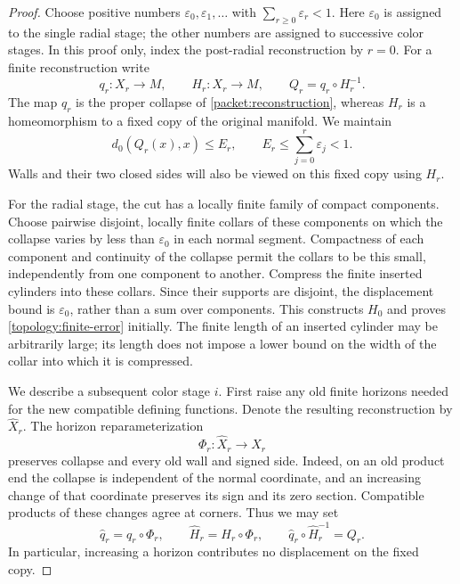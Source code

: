 \documentclass[11pt]{article}
\numberwithin{equation}{section}
\theoremstyle{definition}
\theoremstyle{remark}
\begin{document}
\begin{proof}
Choose positive numbers $\varepsilon_0,\varepsilon_1,\ldots$ with
$\sum_{r\ge0}\varepsilon_r<1$.  Here $\varepsilon_0$ is assigned to the single radial
stage; the other numbers are assigned to successive color stages.
In this proof only, index the post-radial reconstruction by $r=0$.
For a finite reconstruction write
\[
 q_r:X_r\longrightarrow M,\qquad
 H_r:X_r\longrightarrow M,\qquad
 Q_r=q_r\circ H_r^{-1}.
\]
The map $q_r$ is the proper collapse of
\cref{packet:reconstruction}, whereas $H_r$ is a homeomorphism to a
fixed copy of the original manifold.  We maintain
\begin{equation}\label{topology:finite-error}
 d_0(Q_r(x),x)\le E_r,
 \qquad E_r\le\sum_{j=0}^{r}\varepsilon_j<1.
\end{equation}
Walls and their two closed sides will also be viewed on this fixed copy
using $H_r$.

For the radial stage, the cut has a locally finite family of compact
components.  Choose pairwise disjoint, locally finite collars of these
components on which the collapse varies by less than $\varepsilon_0$ in each
normal segment.  Compactness of each component and continuity of the
collapse permit the collars to be this small, independently from one
component to another.  Compress the finite inserted cylinders into
these collars.  Since their supports are disjoint, the displacement
bound is $\varepsilon_0$, rather than a sum over components.  This constructs
$H_0$ and proves \eqref{topology:finite-error} initially.  The finite
length of an inserted cylinder may be arbitrarily large; its length
does not impose a lower bound on the width of the collar into which it
is compressed.

We describe a subsequent color stage $i$.  First raise any old finite
horizons needed for the new compatible defining functions.  Denote the
resulting reconstruction by $\widehat X_r$.  The horizon
reparameterization
\[
 \Phi_r:\widehat X_r\longrightarrow X_r
\]
preserves collapse and every old wall and signed side.  Indeed, on an
old product end the collapse is independent of the normal coordinate,
and an increasing change of that coordinate preserves its sign and its
zero section.  Compatible products of these changes agree at corners.
Thus we may set
\begin{equation}\label{topology:horizon}
 \widehat q_r=q_r\circ \Phi_r,\qquad
 \widehat H_r=H_r\circ \Phi_r,
 \qquad
 \widehat q_r\circ\widehat H_r^{-1}=Q_r.
\end{equation}
In particular, increasing a horizon contributes no displacement on the
fixed copy.


\end{proof}
\end{document}
